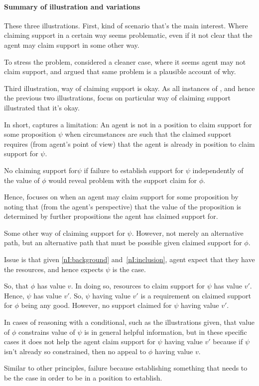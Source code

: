 \paragraph{Summary of illustration and variations}

\begin{note}
  These three illustrations.
  First, kind of scenario that's the main interest.
  Where claiming support in a certain way seems problematic, even if it not clear that the agent may claim support in some other way.

  To stress the problem, considered a cleaner case, where it seems agent may not claim support, and argued that same problem is a plausible account of why.

  Third illustration, way of claiming support is okay.
  As all instances of \nI{}, and hence the previous two illustrations, focus on particular way of claiming support illustrated that it's okay.
\end{note}

\begin{note}[Intuition]
  In short, \nI{} captures a limitation: An agent is not in a position to claim support for some proposition \(\psi\) when circumstances are such that the claimed support requires (from agent's point of view) that the agent is already in position to claim support for \(\psi\).

  No claiming support for\(\psi\) if failure to establish support for \(\psi\) independently of the value of \(\phi\) would reveal problem with the support claim for \(\phi\).

  Hence, \nI{} focuses on when an agent may claim support for some proposition by noting that (from the agent's perspective) that the value of the proposition is determined by further propositions the agent has claimed support for.

  Some other way of claiming support for \(\psi\).
  However, not merely an alternative path, but an alternative path that must be possible given claimed support for \(\phi\).

  Issue is that given \ref{nI:background} and~\ref{nI:inclusion}, agent expect that they have the resources, and hence expects \(\psi\) is the case.

  So, that \(\phi\) has value \(v\).
  In doing so, resources to claim support for \(\psi\) has value \(v'\).
  Hence, \(\psi\) has value \(v'\).
  So, \(\psi\) having value \(v'\) is a requirement on claimed support for \(\phi\) being any good.
  However, no support claimed for \(\psi\) having value \(v'\).

  In cases of reasoning with a conditional, such as the illustrations given, that value of \(\phi\) constrains value of \(\psi\) is in general helpful information, but in these specific cases it does not help the agent claim support for \(\psi\) having value \(v'\) because if \(\psi\) isn't already so constrained, then no appeal to \(\phi\) having value \(v\).

  Similar to other principles, failure because establishing something that needs to be the case in order to be in a position to establish.
\end{note}



